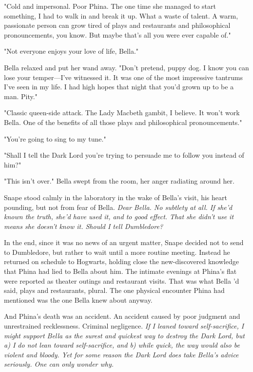 "Cold and impersonal. Poor Phina. The one time she managed to start something, I had to walk in and break it up. What a waste of talent. A warm, passionate person can grow tired of plays and restaurants and philosophical pronouncements, you know. But maybe that's all you were ever capable of."

"Not everyone enjoys your love of life, Bella."

Bella relaxed and put her wand away. "Don't pretend, puppy dog. I know you can lose your temper—I've witnessed it. It was one of the most impressive tantrums I've seen in my life. I had high hopes that night that you'd grown up to be a man. Pity."

"Classic queen-side attack. The Lady Macbeth gambit, I believe. It won't work Bella. One of the benefits of all those plays and philosophical pronouncements."

"You're going to sing to my tune."

"Shall I tell the Dark Lord you're trying to persuade me to follow you instead of him?"

"This isn't over." Bella swept from the room, her anger radiating around her.

Snape stood calmly in the laboratory in the wake of Bella's visit, his heart pounding, but not from fear of Bella. \emph{Dear Bella. No subtlety at all. If she'd known the truth, she'd have used it, and to good effect. That she didn't use it means she doesn't know it. Should I tell Dumbledore?}

In the end, since it was no news of an urgent matter, Snape decided not to send to Dumbledore, but rather to wait until a more routine meeting. Instead he returned on schedule to Hogwarts, holding close the new-discovered knowledge that Phina had lied to Bella about him. The intimate evenings at Phina's flat were reported as theater outings and restaurant visits. That was what Bella 'd said, plays and restaurants, plural. The one physical encounter Phina had mentioned was the one Bella knew about anyway.

And Phina's death was an accident. An accident caused by poor judgment and unrestrained recklessness. Criminal negligence. \emph{If I leaned toward self-sacrifice, I might support Bella as the surest and quickest way to destroy the Dark Lord, but a) I do not lean toward self-sacrifice, and b) while quick, the way would also be violent and bloody. Yet for some reason the Dark Lord does take Bella's advice seriously. One can only wonder why.}

